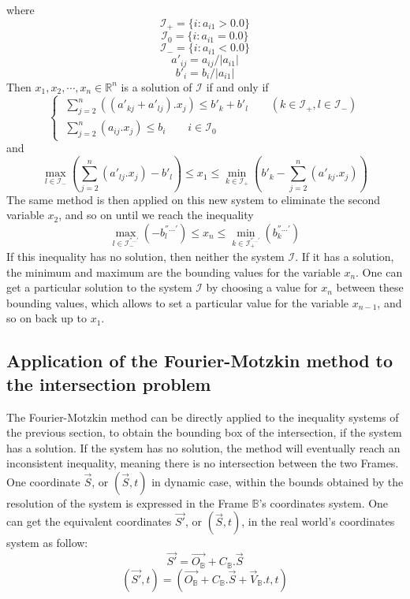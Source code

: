 \documentclass[12pt, a4paper]{article}
\begin{document}
where 
$$\mathcal{I}_+=\{i:a_{i1}>0.0\}$$
$$\mathcal{I}_0=\{i:a_{i1}=0.0\}$$
$$\mathcal{I}_-=\{i:a_{i1}<0.0\}$$
$$a'_{ij}=a_{ij}/|a_{i1}|$$
$$b'_i=b_i/|a_{i1}|$$
Then $x_1, x_2, \cdots, x_n\in\mathbb{R}^n$ is a solution of $\mathcal{I}$ if and only if
\begin{equation}
\left\{\
\begin{array}{c}
\sum_{j=2}^n((a'_{kj}+a'_{lj}).x_j)\le b'_k+b'_l \qquad (k\in\mathcal{I}_+, l\in\mathcal{I}_-)\\
\sum_{j=2}^n(a_{ij}.x_j)\le b_i \qquad i\in\mathcal{I}_0
\end{array}
\right.
\end{equation}
and
\begin{equation}
\max_{l\in\mathcal{I}_-}(\sum_{j=2}^n(a'_{lj}.x_j)-b'_l)\le x_1\le\min_{k\in\mathcal{I}_+}(b'_k-\sum_{j=2}^n(a'_{kj}.x_j))
\end{equation}
The same method is then applied on this new system to eliminate the second variable $x_2$, and so on until we reach the inequality
\begin{equation}
\max_{l\in\mathcal{I}^{''...'}_-}(-b^{''...'}_l)\le x_n\le\min_{k\in\mathcal{I}^{''...'}_+}(b^{''...'}_k)
\end{equation}
If this inequality has no solution, then neither the system $\mathcal{I}$. If it has a solution, the minimum and maximum are the bounding values for the variable $x_n$. One can get a particular solution to the system $\mathcal{I}$ by choosing a value for $x_n$ between these bounding values, which allows to set a particular value for the variable $x_{n-1}$, and so on back up to $x_1$. 

\subsection{Application of the Fourier-Motzkin method to the intersection problem}

The Fourier-Motzkin method can be directly applied to the inequality systems of the previous section, to obtain the bounding box of the intersection, if the system has a solution. If the system has no solution, the method will eventually reach an inconsistent inequality, meaning there is no intersection between the two Frames.\\

One coordinate $\overrightarrow{S}$, or $(\overrightarrow{S}, t)$ in dynamic case, within the bounds obtained by the resolution of the system is expressed in the Frame $\mathbb{B}$'s coordinates system. One can get the equivalent coordinates $\overrightarrow{S'}$, or $(\overrightarrow{S}, t)$, in the real world's coordinates system as follow:
\begin{equation}
\overrightarrow{S'}=\overrightarrow{O_\mathbb{B}}+C_\mathbb{B}.\overrightarrow{S}
\end{equation}
\begin{equation}
(\overrightarrow{S'},t)=\left(\overrightarrow{O_\mathbb{B}}+C_\mathbb{B}.\overrightarrow{S}+\overrightarrow{V}_\mathbb{B}.t, t\right)
\end{equation}
\end{document}
